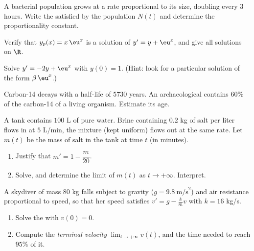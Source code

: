 \begin{exercise}[$\star$]\label{exo:g12:diffeq:2}
A bacterial population grows at a rate proportional to its size, doubling
every $3$ hours. Write the  satisfied by the population
$N(t)$ and determine the proportionality constant.
\end{exercise}

\begin{exercise}[$\star$]\label{exo:g12:diffeq:3}
Verify that $y_p(x) = x\,\eu^{x}$ is a solution of $y' = y + \eu^x$, and
give all solutions on $\R$.
\end{exercise}

\begin{exercise}[$\star\star$]\label{exo:g12:diffeq:4}
Solve $y' = -2y + \eu^{x}$ with $y(0) = 1$.
(Hint: look for a particular solution of the form $\beta\,\eu^{x}$.)
\end{exercise}

\begin{exercise}[$\star\star$]\label{exo:g12:diffeq:5}
Carbon-14 decays with a half-life of $5730$ years. An archaeological 
contains $60\%$ of the carbon-14 of a living organism. Estimate its age.
\end{exercise}

\begin{exercise}[$\star\star$]\label{exo:g12:diffeq:6}
A tank contains $100$ L of pure water. Brine containing $0.2$ kg of salt per
liter flows in at $5$ L/min, the mixture (kept uniform) flows out at the same
rate. Let $m(t)$ be the mass of salt in the tank at time $t$ (in minutes).
\begin{enumerate}
  \item Justify that $m' = 1 - \dfrac{m}{20}$.
  \item Solve, and determine the limit of $m(t)$ as $t \to +\infty$.
        Interpret.
\end{enumerate}
\end{exercise}

\begin{exercise}[$\star\star$]\label{exo:g12:diffeq:7}
A skydiver of mass $80$ kg falls subject to gravity
($g = 9.8\ \text{m/s}^2$) and air resistance proportional to speed, so that
her speed satisfies $v' = g - \frac{k}{m}v$ with $k = 16$ kg/s.
\begin{enumerate}
  \item Solve the  with $v(0) = 0$.
  \item Compute the \emph{terminal velocity} $\lim_{t\to+\infty} v(t)$, and
        the time needed to reach $95\%$ of it.
\end{enumerate}
\end{exercise}

